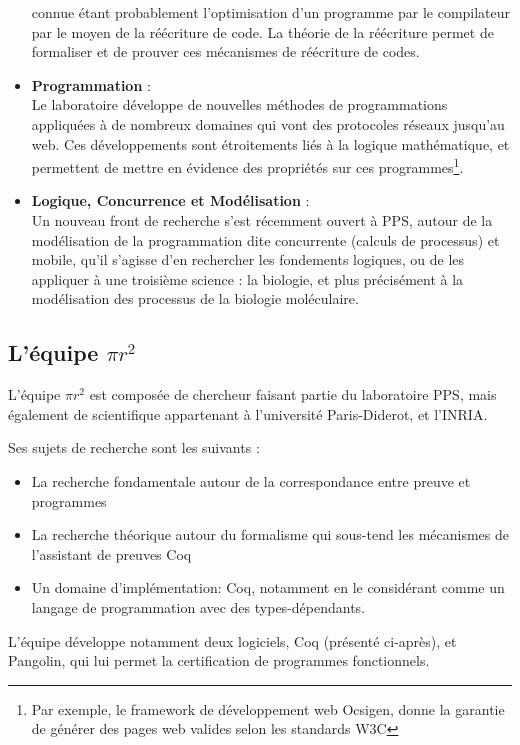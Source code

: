\documentclass[a4paper, 11pt]{report}
\newcommand{\pir}[0]{\textbf{$\pi r^2$}\xspace}
\begin{document}
\begin{itemize}
          connue étant probablement l'optimisation d'un programme par le
          compilateur par le moyen de la réécriture de code.
          La théorie de la réécriture permet de formaliser et de prouver ces
          mécanismes de réécriture de codes.
        \item \textbf{Programmation} : \\
          Le laboratoire développe de nouvelles méthodes de programmations
          appliquées à de nombreux domaines qui vont des protocoles réseaux
          jusqu'au web. Ces développements sont étroitements liés à la
          logique mathématique, et permettent de mettre en évidence des
          propriétés sur ces programmes\footnote{Par exemple, le framework de
          développement web Ocsigen, donne la garantie de générer des pages
          web valides selon les standards W3C}.
        \item \textbf{Logique, Concurrence et Modélisation} : \\
          Un nouveau front de recherche s'est récemment ouvert à PPS, autour
          de la modélisation de la programmation dite concurrente (calculs de
          processus) et mobile, qu'il s'agisse d'en rechercher les fondements
          logiques, ou de les appliquer à une troisième science : la
          biologie, et plus précisément à la modélisation des processus de
          la biologie moléculaire.
      \end{itemize}

      \subsection{L'équipe \pir}
      L'équipe \pir{} est composée de chercheur faisant partie du laboratoire
      PPS, mais également de scientifique appartenant à l'université
      Paris-Diderot, et l'INRIA.

      Ses sujets de recherche sont les suivants :
      \begin{itemize}
        \item La recherche fondamentale autour de la correspondance entre preuve et programmes
        \item La recherche théorique autour du formalisme qui sous-tend les
          mécanismes de l'assistant de preuves Coq
        \item Un domaine d'implémentation: Coq, notamment en le considérant comme
          un langage de programmation avec des types-dépendants.
      \end{itemize}
      L'équipe développe notamment deux logiciels, Coq (présenté ci-après),
      et Pangolin, qui lui permet la certification de programmes fonctionnels.
\end{document}
